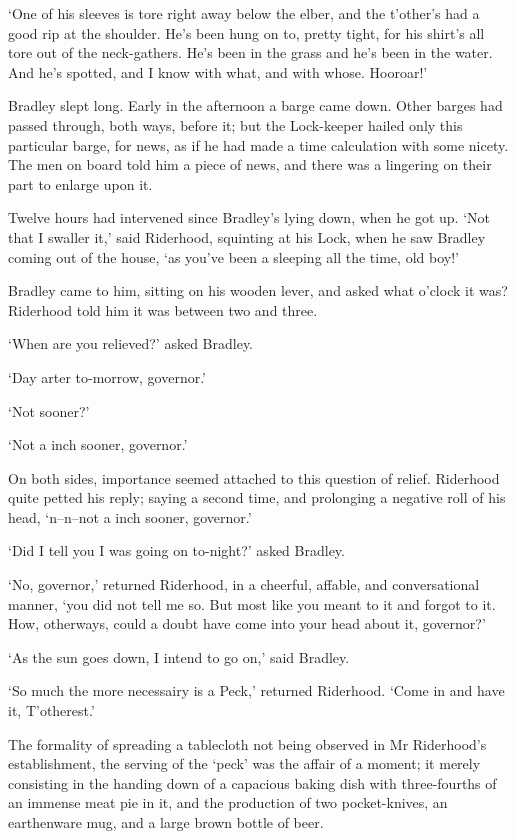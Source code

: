 ‘One of his sleeves is tore right away below the elber, and the
t’other’s had a good rip at the shoulder. He’s been hung on to, pretty
tight, for his shirt’s all tore out of the neck-gathers. He’s been in
the grass and he’s been in the water. And he’s spotted, and I know with
what, and with whose. Hooroar!’

Bradley slept long. Early in the afternoon a barge came down. Other
barges had passed through, both ways, before it; but the Lock-keeper
hailed only this particular barge, for news, as if he had made a time
calculation with some nicety. The men on board told him a piece of news,
and there was a lingering on their part to enlarge upon it.

Twelve hours had intervened since Bradley’s lying down, when he got up.
‘Not that I swaller it,’ said Riderhood, squinting at his Lock, when he
saw Bradley coming out of the house, ‘as you’ve been a sleeping all the
time, old boy!’

Bradley came to him, sitting on his wooden lever, and asked what o’clock
it was? Riderhood told him it was between two and three.

‘When are you relieved?’ asked Bradley.

‘Day arter to-morrow, governor.’

‘Not sooner?’

‘Not a inch sooner, governor.’

On both sides, importance seemed attached to this question of relief.
Riderhood quite petted his reply; saying a second time, and prolonging a
negative roll of his head, ‘n--n--not a inch sooner, governor.’

‘Did I tell you I was going on to-night?’ asked Bradley.

‘No, governor,’ returned Riderhood, in a cheerful, affable, and
conversational manner, ‘you did not tell me so. But most like you meant
to it and forgot to it. How, otherways, could a doubt have come into
your head about it, governor?’

‘As the sun goes down, I intend to go on,’ said Bradley.

‘So much the more necessairy is a Peck,’ returned Riderhood. ‘Come in
and have it, T’otherest.’

The formality of spreading a tablecloth not being observed in Mr
Riderhood’s establishment, the serving of the ‘peck’ was the affair of
a moment; it merely consisting in the handing down of a capacious baking
dish with three-fourths of an immense meat pie in it, and the production
of two pocket-knives, an earthenware mug, and a large brown bottle of
beer.

